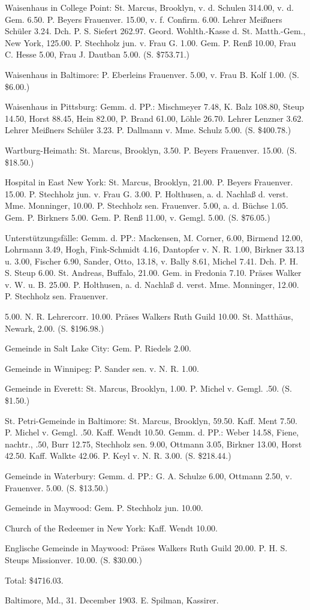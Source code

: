 Waisenhaus in College Point: St. Marcus, Brooklyn, v. d. Schulen 314.00, v. d. Gem. 6.50. P. Beyers Frauenver. 15.00, v. f. Confirm. 6.00. Lehrer Meißners Schüler 3.24. Dch. P. S. Siefert 262.97. Geord. Wohlth.-Kasse d. St. Matth.-Gem., New York, 125.00. P. Stechholz jun. v. Frau G. 1.00. Gem. P. Renß 10.00, Frau C. Hesse 5.00, Frau J. Dautban 5.00. (S. \$753.71.)

Waisenhaus in Baltimore: P. Eberleins Frauenver. 5.00, v. Frau B. Kolf 1.00. (S. \$6.00.)

Waisenhaus in Pittsburg: Gemm. d. PP.: Mischmeyer 7.48, K. Balz 108.80, Steup 14.50, Horst 88.45, Hein 82.00, P. Brand 61.00, Löhle 26.70. Lehrer Lenzner 3.62. Lehrer Meißners Schüler 3.23. P. Dallmann v. Mme. Schulz 5.00. (S. \$400.78.)

Wartburg-Heimath: St. Marcus, Brooklyn, 3.50. P. Beyers Frauenver. 15.00. (S. \$18.50.)

Hospital in East New York: St. Marcus, Brooklyn, 21.00. P. Beyers Frauenver. 15.00. P. Stechholz jun. v. Frau G. 3.00. P. Holthusen, a. d. Nachlaß d. verst. Mme. Monninger, 10.00. P. Stechholz sen. Frauenver. 5.00, a. d. Büchse 1.05. Gem. P. Birkners 5.00. Gem. P. Renß 11.00, v. Gemgl. 5.00. (S. \$76.05.)

Unterstützungsfälle: Gemm. d. PP.: Mackensen, M. Corner, 6.00, Birmend 12.00, Lohrmann 3.49, Hogh, Fink-Schmidt 4.16, Dantopfer v. N. R. 1.00, Birkner 33.13 u. 3.00, Fischer 6.90, Sander, Otto, 13.18, v. Bally 8.61, Michel 7.41. Dch. P. H. S. Steup 6.00. St. Andreas, Buffalo, 21.00. Gem. in Fredonia 7.10. Präses Walker v. W. u. B. 25.00. P. Holthusen, a. d. Nachlaß d. verst. Mme. Monninger, 12.00. P. Stechholz sen. Frauenver.

5.00. N. R. Lehrercorr. 10.00. Präses Walkers Ruth Guild 10.00. St. Matthäus, Newark, 2.00. (S. \$196.98.)

Gemeinde in Salt Lake City: Gem. P. Riedels 2.00.

Gemeinde in Winnipeg: P. Sander sen. v. N. R. 1.00.

Gemeinde in Everett: St. Marcus, Brooklyn, 1.00. P. Michel v. Gemgl. .50. (S. \$1.50.)

St. Petri-Gemeinde in Baltimore: St. Marcus, Brooklyn, 59.50. Kaff. Ment 7.50. P. Michel v. Gemgl. .50. Kaff. Wendt 10.50. Gemm. d. PP.: Weber 14.58, Fiene, nachtr., .50, Burr 12.75, Stechholz sen. 9.00, Ottmann 3.05, Birkner 13.00, Horst 42.50. Kaff. Walkte 42.06. P. Keyl v. N. R. 3.00. (S. \$218.44.)

Gemeinde in Waterbury: Gemm. d. PP.: G. A. Schulze 6.00, Ottmann 2.50, v. Frauenver. 5.00. (S. \$13.50.)

Gemeinde in Maywood: Gem. P. Stechholz jun. 10.00.

Church of the Redeemer in New York: Kaff. Wendt 10.00.

Englische Gemeinde in Maywood: Präses Walkers Ruth Guild 20.00. P. H. S. Steups Missionver. 10.00. (S. \$30.00.)

Total: \$4716.03.

Baltimore, Md., 31. December 1903. E. Spilman, Kassirer.
